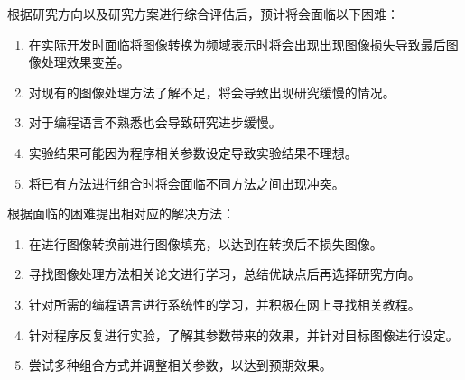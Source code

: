 
根据研究方向以及研究方案进行综合评估后，预计将会面临以下困难：
\begin{enumerate}[label=\arabic*)]
    \item 在实际开发时面临将图像转换为频域表示时将会出现出现图像损失导致最后图像处理效果变差。
    \item 对现有的图像处理方法了解不足，将会导致出现研究缓慢的情况。
    \item 对于编程语言不熟悉也会导致研究进步缓慢。
    \item 实验结果可能因为程序相关参数设定导致实验结果不理想。
    \item 将已有方法进行组合时将会面临不同方法之间出现冲突。
\end{enumerate}

根据面临的困难提出相对应的解决方法：
\begin{enumerate}[label=\arabic*)]
    \item 在进行图像转换前进行图像填充，以达到在转换后不损失图像。
    \item 寻找图像处理方法相关论文进行学习，总结优缺点后再选择研究方向。
    \item 针对所需的编程语言进行系统性的学习，并积极在网上寻找相关教程。
    \item 针对程序反复进行实验，了解其参数带来的效果，并针对目标图像进行设定。
    \item 尝试多种组合方式并调整相关参数，以达到预期效果。
\end{enumerate}